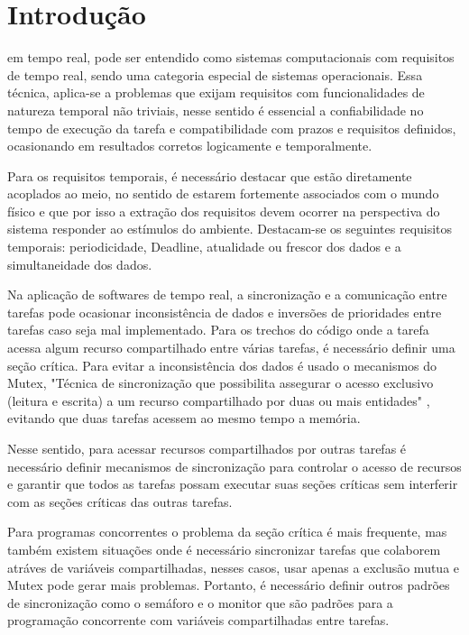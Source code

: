 \documentclass[journal]{IEEEtran}
\begin{document}
\IEEEpeerreviewmaketitle

\section{Introdução}

 em tempo real, pode ser entendido como sistemas computacionais com requisitos de tempo real, sendo uma categoria especial de sistemas operacionais. Essa técnica, aplica-se a problemas que exijam requisitos com funcionalidades de natureza temporal não triviais, nesse sentido é essencial a confiabilidade no tempo de execução da tarefa e compatibilidade com prazos e requisitos definidos, ocasionando em resultados corretos logicamente e temporalmente\cite{IEEEhowto:romulo}.

Para os requisitos temporais, é necessário destacar que estão diretamente acoplados ao meio, no sentido de estarem fortemente associados com o mundo físico e que por isso a extração dos requisitos devem ocorrer na perspectiva do sistema responder ao estímulos do ambiente. Destacam-se os seguintes requisitos temporais:  periodicidade, Deadline, atualidade ou frescor dos dados e a simultaneidade dos dados\cite{IEEEhowto:romulo}.

Na aplicação de softwares de tempo real, a sincronização e a comunicação entre tarefas pode ocasionar inconsistência de dados e inversões de prioridades entre tarefas caso seja mal implementado. Para os trechos do código onde a tarefa acessa algum recurso compartilhado entre várias tarefas, é necessário definir uma seção crítica. Para evitar a inconsistência dos dados é usado o mecanismos do Mutex, "Técnica de sincronização que possibilita assegurar o acesso exclusivo (leitura e escrita) a um recurso compartilhado por duas ou mais entidades" \cite{IEEEhowto:Borges}, evitando que duas tarefas acessem ao mesmo tempo a memória. 

Nesse sentido, para acessar recursos compartilhados por outras tarefas é necessário definir mecanismos de sincronização para controlar o acesso de recursos e garantir que todos as tarefas possam executar suas seções críticas sem interferir com as seções críticas das outras tarefas.

Para programas concorrentes o problema da seção crítica é mais frequente, mas também existem  situações onde é necessário sincronizar tarefas que colaborem atráves de variáveis compartilhadas, nesses casos, usar apenas a exclusão mutua e Mutex pode gerar mais problemas. Portanto, é necessário definir outros padrões de sincronização como o semáforo e o monitor que são padrões para a programação concorrente com variáveis compartilhadas entre tarefas.
\end{document}
